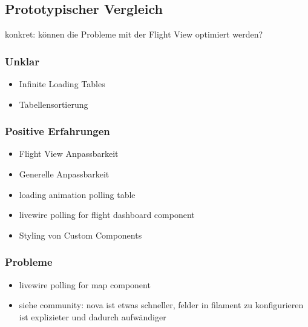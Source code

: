 \subsection{Prototypischer Vergleich}
konkret: können die Probleme mit der Flight View optimiert werden?

\subsubsection{Unklar}
\begin{itemize}
    \item Infinite Loading Tables
    \item Tabellensortierung
\end{itemize}

\subsubsection{Positive Erfahrungen}
\begin{itemize}
    \item Flight View Anpassbarkeit
    \item Generelle Anpassbarkeit
    \item loading animation polling table
    \item livewire polling for flight dashboard component
    \item Styling von Custom Components
\end{itemize}

\subsubsection{Probleme}
\begin{itemize}
    \item livewire polling for map component
    \item siehe community: nova ist etwas schneller, felder in filament zu konfigurieren ist explizieter und dadurch aufwändiger
\end{itemize}
